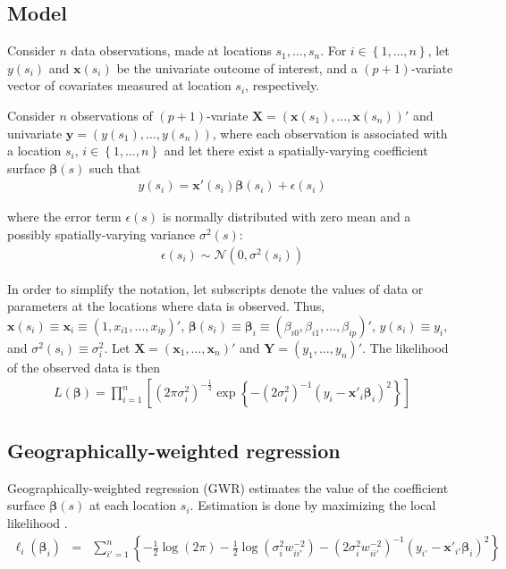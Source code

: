 \documentclass[authoryear, review, 11pt]{elsarticle}
\begin{document}
	\subsection{Model}
	Consider $n$ data observations, made at locations $s_1, \dots, s_n$. For $i \in \left\{1, \dots, n \right\}$, let $y(s_i)$ and $\bm{x}(s_i)$ be the univariate outcome of interest, and a $(p+1)$-variate vector of covariates measured at location $s_i$, respectively.
	
	
	Consider $n$ observations of $(p+1)$-variate $\bm{X} = \left( \bm{x}(s_1), \dots, \bm{x}(s_n) \right)'$ and univariate $\bm{y} = \left( y(s_1), \dots, y(s_n) \right)$, where each observation is associated with a location $s_i$, $i \in \left\{ 1, \dots, n \right\}$ and let there exist a spatially-varying coefficient surface $\bm{\beta}(s)$ such that	
	\begin{eqnarray}
		y(s_i) = \bm{x}'(s_i) \bm{\beta}(s_i) + \epsilon(s_i)
	\end{eqnarray}
	
	where the error term $\epsilon(s)$ is normally distributed with zero mean and a possibly spatially-varying variance $\sigma^2(s)$:	
	\begin{eqnarray}
		\epsilon(s_i) \sim \mathcal{N} \left( 0,\sigma^2(s_i) \right)
	\end{eqnarray}
	
	In order to simplify the notation, let subscripts denote the values of data or parameters at the locations where data is observed. Thus, $\bm{x}(s_i) \equiv \bm{x}_i \equiv \left( 1, x_{i1}, \dots, x_{ip} \right)'$, $\bm{\beta}(s_i) \equiv \bm{\beta}_i \equiv \left(\beta_{i0}, \beta_{i1}, \dots, \beta_{ip} \right)'$, $y(s_i) \equiv y_i$, and $\sigma^2(s_i) \equiv \sigma^2_i$. Let $\bm{X} = \left( \bm{x}_1, \dots, \bm{x}_n \right)'$ and $\bm{Y} = \left( y_1, \dots, y_n \right)'$. The likelihood of the observed data is then	 
	 \begin{eqnarray}
	 	L\left( \bm{\beta} \right) = \prod_{i=1}^n \left[ \left(2 \pi \sigma^2_i\right)^{-\frac{1}{2}} \exp \left\{-\left( 2\sigma^2_i \right)^{-1} \left(y_i - \bm{x}'_i\bm{\beta}_i \right)^2 \right\} \right]
	\end{eqnarray}
	
	\subsection{Geographically-weighted regression}
	Geographically-weighted regression (GWR) estimates the value of the coefficient surface $\bm{\beta}(s)$ at each location $s_i$. Estimation is done by maximizing the local likelihood \citep{Fotheringham:2002}.	
	\begin{eqnarray}
		\ell_i\left(\bm{\beta}_i\right) &=& \sum_{i'=1}^n \left\{ -\frac{1}{2} \log{\left(2 \pi\right)}  - \frac{1}{2} \log{\left(\sigma^2_i w^{-2}_{ii'} \right)}  -\left( 2 \sigma^2_i w^{-2}_{ii'} \right)^{-1} \left(y_{i'} - \bm{x}'_{i'} \bm{\beta}_i \right)^2 \right\}
	\end{eqnarray}
	
\end{document}
